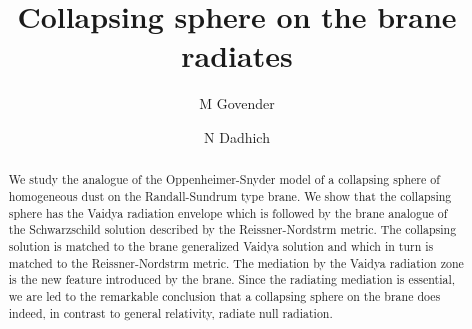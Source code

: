 \documentclass[a4paper,twocolumn,showpacs,preprintnumbers,amsmath,amssymb]{revtex4}
\begin{document}
\title{Collapsing sphere on the brane radiates}



\author{M Govender\coordHE{}}
\author{N Dadhich\coordHE{}}
\
\




\begin{abstract}
We study the analogue of the Oppenheimer-Snyder model of a collapsing sphere
of homogeneous dust on the Randall-Sundrum type brane. We show that the
collapsing sphere has the Vaidya radiation envelope which is followed by
the brane analogue of the Schwarzschild solution described by the
Reissner-Nordstr\coordHE{}m metric. The collapsing solution is matched to 
the brane generalized Vaidya solution and which in turn is matched to the 
Reissner-Nordstr\myHighlight{${\ddot o}$}\coordHE{}m metric. The mediation by the Vaidya radiation 
zone is 
the new feature introduced by the brane. Since the radiating mediation is 
essential, we are led to the remarkable conclusion that a collapsing 
sphere on the brane does indeed, in contrast to general relativity, 
radiate null radiation.
\end{abstract}




\maketitle
\end{document}
